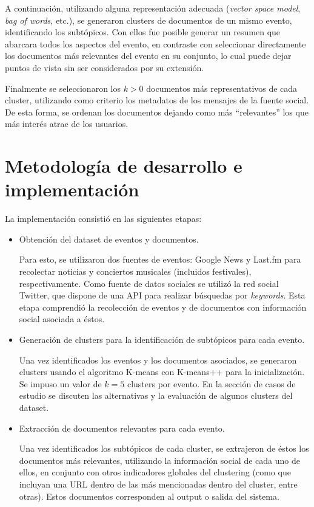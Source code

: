 \documentclass[upright, contnum]{umemoria}
\begin{document}
   A continuación, utilizando alguna representación adecuada 
   (\emph{vector space model}, \emph{bag of words}, etc.), se generaron clusters
   de documentos de un mismo evento, identificando los subtópicos. Con
   ellos fue posible generar un resumen que abarcara todos los
   aspectos del evento, en contraste con seleccionar directamente los
   documentos más relevantes del evento en su conjunto, lo cual puede
   dejar puntos de vista sin ser considerados por su extensión. 

   Finalmente se seleccionaron los $k>0$ documentos más representativos de
   cada cluster, utilizando como criterio los metadatos de los
   mensajes de la fuente social. De esta forma, se ordenan los
   documentos dejando como más ``relevantes'' los que más interés atrae
   de los usuarios.

\section{Metodología de desarrollo e implementación}
\label{sec-4.2}

\label{impl}

   La implementación consistió en las siguientes etapas:

\begin{itemize}
\item Obtención del dataset de eventos y documentos.

     Para esto, se utilizaron dos fuentes de eventos: Google News y
     Last.fm para recolectar noticias y conciertos musicales
     (incluidos festivales), respectivamente. Como fuente de datos
     sociales se utilizó la red social Twitter, que dispone de una API
     para realizar búsquedas por \emph{keywords}. Esta etapa comprendió
     la recolección de eventos y de documentos con información social
     asociada a éstos.
\item Generación de clusters para la identificación de subtópicos para
     cada evento.

     Una vez identificados los eventos y los documentos asociados, se
     generaron clusters usando el algoritmo K-means con K-means++ para
     la inicialización. Se impuso un valor de $k=5$ clusters por
     evento. En la sección de casos de estudio se discuten las
     alternativas y la evaluación de algunos clusters del dataset.
\item Extracción de documentos relevantes para cada evento.

     Una vez identificados los subtópicos de cada cluster, se
     extrajeron de éstos los documentos más relevantes, utilizando la
     información social de cada uno de ellos, en conjunto con otros
     indicadores globales del clustering (como que incluyan una URL
     dentro de las más mencionadas dentro del cluster, entre
     otras). Estos documentos corresponden al output o salida del
     sistema.
\end{itemize}
\end{document}
